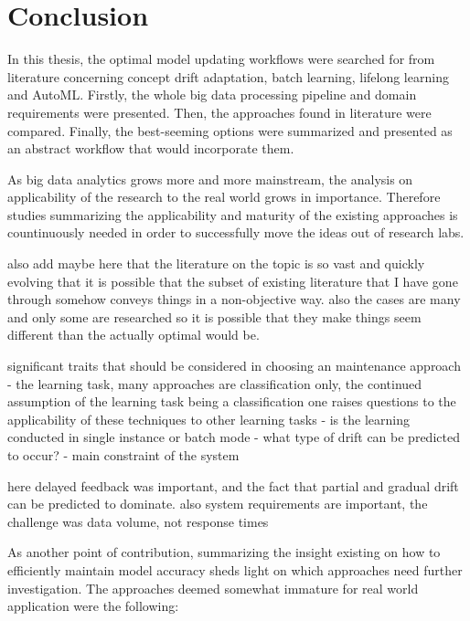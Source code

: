\chapter{Conclusion}

In this thesis, the optimal model updating workflows were searched for from literature concerning concept drift adaptation, batch learning, lifelong learning and AutoML. Firstly, the whole big data processing pipeline and domain requirements were presented. Then, the approaches found in literature were compared. Finally, the best-seeming options were summarized and presented as an abstract workflow that would incorporate them.

As big data analytics grows more and more mainstream, the analysis on applicability of the research to the real world grows in importance. Therefore studies summarizing the applicability and maturity of the existing approaches is countinuously needed in order to successfully move the ideas out of research labs.


also add maybe here that the literature on the topic is so vast and quickly evolving that it is possible that the subset of existing literature that I have gone through somehow conveys things in a non-objective way. also the cases are many and only some are researched so it is possible that they make things seem different than the actually optimal would be.

significant traits that should be considered in choosing an maintenance approach
 - the learning task, many approaches are classification only, the continued assumption of the learning task being a classification one raises questions to the applicability of these techniques to other learning tasks
 - is the learning conducted in single instance or batch mode
 - what type of drift can be predicted to occur?
 - main constraint of the system
 
 here delayed feedback was important, and the fact that partial and gradual drift can be predicted to dominate. also system requirements are important, the challenge was data volume, not response times
 
 As another point of contribution, summarizing the insight existing on how to efficiently maintain model accuracy sheds light on which approaches need further investigation. The approaches deemed somewhat immature for real world application were the following:
 
